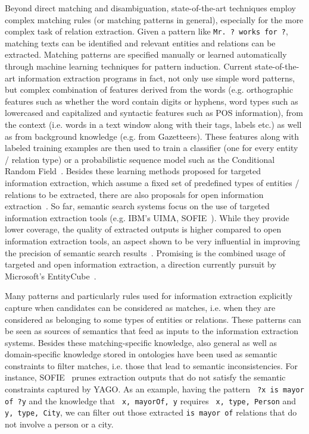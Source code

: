 Beyond direct matching and disambiguation, state-of-the-art techniques employ complex matching rules (or matching patterns in general), especially for the more complex task of relation extraction. Given a pattern like \verb+Mr. ? works for ?+, matching texts can be identified and relevant entities and relations can be extracted. Matching patterns are specified manually or learned automatically through machine learning techniques for pattern induction. Current state-of-the-art information extraction programs in fact, not only use simple word patterns, but complex combination of features derived from the words (e.g. orthographic features such as whether the word contain digits or hyphens, word types such as lowercased and capitalized and syntactic features such as POS information), from the context (i.e. words in a text window along with their tags, labels etc.) as well as from background knowledge (e.g. from Gazetteers). These features along with labeled training examples are then used to train a classifier (one for every entity / relation type) or a probabilistic sequence model such as the Conditional Random Field~\cite{DBLP:conf/icml/ZhuNWZM05}. Besides these learning methods proposed for targeted information extraction, which assume a fixed set of predefined types of entities / relations to be extracted, there are also proposals for open information extraction~\cite{DBLP:conf/ijcai/EtzioniFCSM11}. So far, semantic search systems focus on the use of targeted information extraction tools (e.g. IBM's UIMA, SOFIE~\cite{DBLP:conf/www/SuchanekSW09}). While they provide lower coverage, the quality of extracted outputs is higher compared to open information extraction tools, an aspect shown to be very influential in improving the precision of semantic search results~\cite{DBLP:conf/sigir/Chu-CarrollPCFD06,DBLP:conf/cikm/Chu-CarrollP07}. Promising is the combined usage of targeted and open information extraction, a direction currently pursuit by Microsoft's EntityCube~\cite{DBLP:conf/www/ZhuNLZW09}.  

Many patterns and particularly rules used for information extraction explicitly capture when candidates can be considered as matches, i.e. when they are considered as belonging to some types of entities or relations. These patterns can be seen as sources of semantics that feed as inputs to the information extraction systems. Besides these matching-specific knowledge, also general as well as domain-specific knowledge stored in ontologies have been used as semantic constraints to filter matches, i.e. those that lead to semantic inconsistencies. For instance, SOFIE~\cite{DBLP:conf/www/SuchanekSW09} prunes extraction outputs that do not satisfy the semantic constraints captured by YAGO. As an example, having the pattern \verb+ ?x is mayor of ?y+ and the knowledge that \verb+ x, mayorOf, y+ requires \verb+ x, type, Person+ and \verb+ y, type, City+, we can filter out those extracted \verb+is mayor of+ relations that do not involve a person or a city. 


